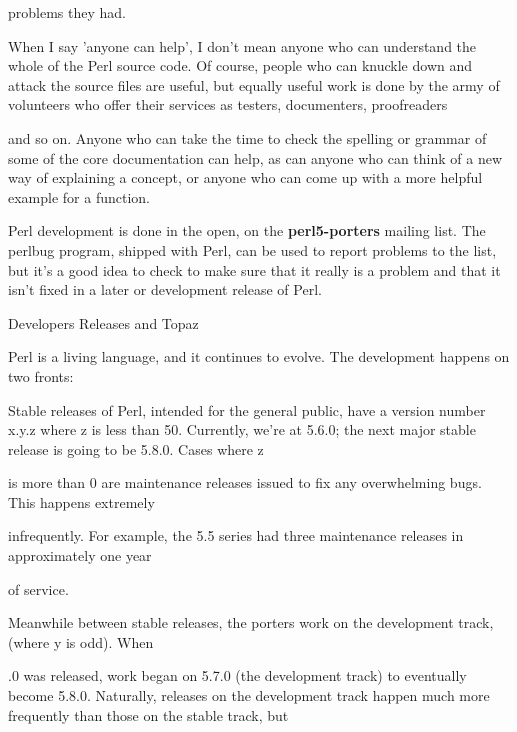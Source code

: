 \documentclass[a4paper,11pt]{book}
\begin{document}
\noindent problems they had.

\noindent 

\noindent When I say 'anyone can help', I don't mean anyone who can understand the whole of the Perl source code. Of course, people who can knuckle down and attack the source files are useful, but equally useful work is done by the army of volunteers who offer their services as testers, documenters, proofreaders

\noindent and so on. Anyone who can take the time to check the spelling or grammar of some of the core documentation can help, as can anyone who can think of a new way of explaining a concept, or anyone who can come up with a more helpful example for a function.

\noindent 

\noindent Perl development  is done  in the  open,  on  the  \textbf{perl5-porters  }mailing  list.  The perlbug program, shipped with Perl,  can be used  to  report  problems  to  the  list,  but it's  a  good idea  to  check  to make sure that it really is a problem and that it isn't fixed in a later or development release of Perl.

\noindent 

\noindent Developers Releases and Topaz

\noindent 

\noindent Perl is a living language, and it continues to evolve. The development happens on two fronts:

\noindent 

\noindent Stable releases of Perl,  intended  for the  general  public,  have  a  version  number  x.y.z  where  z  is  less than 50.  Currently,  we're at  5.6.0;  the  next  major  stable  release  is  going  to  be  5.8.0.  Cases  where  z

\noindent is  more than 0 are maintenance  releases  issued  to  fix  any  overwhelming  bugs.  This  happens  extremely

\noindent infrequently.  For example,  the  5.5  series  had  three  maintenance  releases  in  approximately one year

\noindent of service.

\noindent 

\noindent 

\noindent Meanwhile between stable releases, the porters work on the development track, (where y is odd). When

.0 was released, work began on 5.7.0 (the development track) to eventually become 5.8.0. Naturally, releases on the development track happen much more frequently than those on the stable track, but
\end{document}
